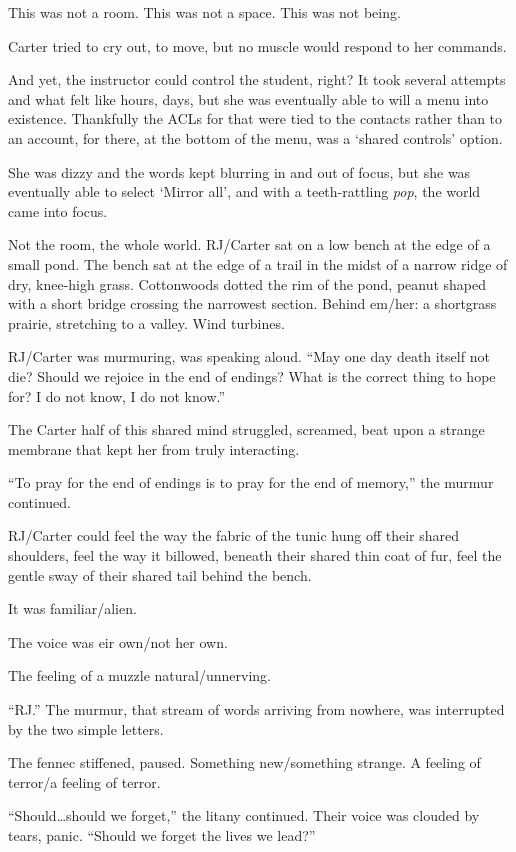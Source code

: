 This was not a room. This was not a space. This was not being.

Carter tried to cry out, to move, but no muscle would respond to her commands.

And yet, the instructor could control the student, right? It took several attempts and what felt like hours, days, but she was eventually able to will a menu into existence. Thankfully the ACLs for that were tied to the contacts rather than to an account, for there, at the bottom of the menu, was a `shared controls' option.

She was dizzy and the words kept blurring in and out of focus, but she was eventually able to select `Mirror all', and with a teeth-rattling \emph{pop}, the world came into focus.

Not the room, the whole world. RJ/Carter sat on a low bench at the edge of a small pond. The bench sat at the edge of a trail in the midst of a narrow ridge of dry, knee-high grass. Cottonwoods dotted the rim of the pond, peanut shaped with a short bridge crossing the narrowest section. Behind em/her: a shortgrass prairie, stretching to a valley. Wind turbines.

RJ/Carter was murmuring, was speaking aloud. ``May one day death itself not die? Should we rejoice in the end of endings? What is the correct thing to hope for? I do not know, I do not know.''

The Carter half of this shared mind struggled, screamed, beat upon a strange membrane that kept her from truly interacting.

``To pray for the end of endings is to pray for the end of memory,'' the murmur continued.

RJ/Carter could feel the way the fabric of the tunic hung off their shared shoulders, feel the way it billowed, beneath their shared thin coat of fur, feel the gentle sway of their shared tail behind the bench.

It was familiar/alien.

The voice was eir own/not her own.

The feeling of a muzzle natural/unnerving.

``RJ.'' The murmur, that stream of words arriving from nowhere, was interrupted by the two simple letters.

The fennec stiffened, paused. Something new/something strange. A feeling of terror/a feeling of terror.

``Should\ldots{}should we forget,'' the litany continued. Their voice was clouded by tears, panic. ``Should we forget the lives we lead?''

